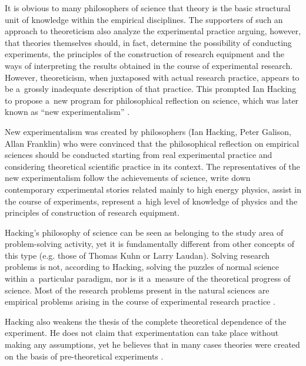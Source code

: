 It is obvious to many philosophers of science that theory is the basic structural unit of knowledge within the empirical disciplines. The supporters of such an approach to theoreticism also analyze the experimental practice arguing, however, that theories themselves should, in fact, determine the possibility of conducting experiments, the principles of the construction of research equipment and the ways of interpreting the results obtained in the course of experimental research. However, theoreticism, when juxtaposed with actual research practice, appears to be a~grossly inadequate description of that practice. This prompted Ian Hacking to propose a~new program for philosophical reflection on science, which was later known as ``new experimentalism'' 
\parencites[][]{hacking_representing_1983}[][]{ackermann_new_1989}.%




New experimentalism was created by philosophers (Ian Hacking, Peter Galison, Allan Franklin) who were convinced that the philosophical reflection on empirical sciences should be conducted starting from real experimental practice and considering theoretical scientific practice in its context. The representatives of the new experimentalism follow the achievements of science, write down contemporary experimental stories related mainly to high energy physics, assist in the course of experiments, represent a~high level of knowledge of physics and the principles of construction of research equipment.



Hacking's philosophy of science can be seen as belonging to the study area of problem-solving activity, yet it is fundamentally different from other concepts of this type (e.g. those of Thomas Kuhn or Larry Laudan). Solving research problems is not, according to Hacking, solving the puzzles of normal science within a~particular paradigm, nor is it a~measure of the theoretical progress of science. Most of the research problems present in the natural sciences are empirical problems arising in the course of experimental research practice 
\parencite[][]{sobczynska_why_2021}.%




Hacking also weakens the thesis of the complete theoretical dependence of the experiment. He does not claim that experimentation can take place without making any assumptions, yet he believes that in many cases theories were created on the basis of pre-theoretical experiments 
\parencite[][]{hacking_representing_1983}.%




